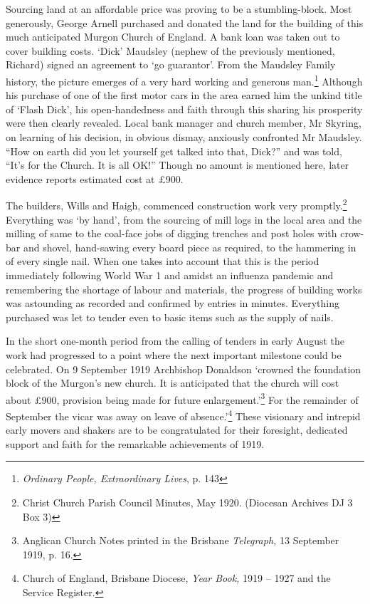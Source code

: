 Sourcing land at an affordable price was proving to be a
stumbling-block. Most generously, George Arnell purchased and donated
the land for the building of this much anticipated Murgon Church of
England. A bank loan was taken out to cover building costs. `Dick'
Maudsley (nephew of the previously mentioned, Richard) signed an
agreement to `go guarantor'. From the Maudsley Family history, the
picture emerges of a very hard working and generous man.\footnote{\emph{Ordinary
  People, Extraordinary Lives}, p. 143} Although his purchase of one of
the first motor cars in the area earned him the unkind title of `Flash
Dick', his open-handedness and faith through this sharing his prosperity
were then clearly revealed. Local bank manager and church member, Mr
Skyring, on learning of his decision, in obvious dismay, anxiously
confronted Mr Maudsley. ``How on earth did you let yourself get talked
into that, Dick?'' and was told, ``It's for the Church. It is all OK!''
Though no amount is mentioned here, later evidence reports estimated
cost at £900.

The builders, Wills and Haigh, commenced construction work very
promptly.\footnote{Christ Church Parish Council Minutes, May 1920.
  (Diocesan Archives DJ 3 Box 3)} Everything was `by hand', from the
sourcing of mill logs in the local area and the milling of same to the
coal-face jobs of digging trenches and post holes with crow-bar and
shovel, hand-sawing every board piece as required, to the hammering in
of every single nail. When one takes into account that this is the
period immediately following World War 1 and amidst an influenza
pandemic and remembering the shortage of labour and materials, the
progress of building works was astounding as recorded and confirmed by
entries in minutes. Everything purchased was let to tender even to basic
items such as the supply of nails.

In the short one-month period from the calling of tenders in early
August the work had progressed to a point where the next important
milestone could be celebrated. On 9 September 1919 Archbishop Donaldson
`crowned the foundation block of the Murgon's new church. It is
anticipated that the church will cost about £900, provision being made
for future enlargement.'\footnote{Anglican Church Notes printed in the
  Brisbane \emph{Telegraph,} 13 September 1919, p. 16.} For the
remainder of September the vicar was away on leave of
absence.'\footnote{Church of England, Brisbane Diocese, \emph{Year
  Book,} 1919 -- 1927 and the Service Register.} These visionary and
intrepid early movers and shakers are to be congratulated for their
foresight, dedicated support and faith for the remarkable achievements
of 1919.

